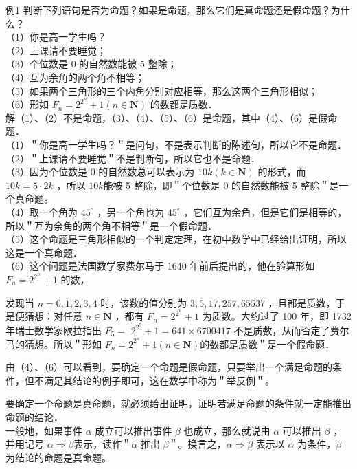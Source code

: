 \documentclass[10pt]{article}
\begin{document}
例1 判断下列语句是否为命题？如果是命题，那么它们是真命题还是假命题？为什么？\\
（1）你是高一学生吗？\\
（2）上课请不要睡觉；\\
（3）个位数是 0 的自然数能被 5 整除；\\
（4）互为余角的两个角不相等；\\
（5）如果两个三角形的三个内角分别对应相等，那么这两个三角形相似；\\
（6）形如 \(F_{n}=2^{2^{n}}+1(n \in \mathbf{N})\) 的数都是质数．\\
解（1）、（2）不是命题，（3）、（4）、（5）、（6）是命题，其中（4）、（6）是假命题．\\
（1）＂你是高一学生吗？＂是问句，不是表示判断的陈述句，所以它不是命题．\\
（2）＂上课请不要睡觉＂不是判断句，所以它也不是命题．\\
（3）因为个位数是 0 的自然数总可以表示为 \(10 k(k \in \mathbf{N})\) 的形式，而 \(10 k=5 \cdot 2 k\) ，所以 \(10 k\)能被 5 整除，即＂个位数是 0 的自然数能被 5 整除＂是一个真命题。\\
（4）取一个角为 \(45^{\circ}\) ，另一个角也为 \(45^{\circ}\) ，它们互为余角，但是它们是相等的，所以＂互为余角的两个角不相等＂是一个假命题．\\
（5）这个命题是三角形相似的一个判定定理，在初中数学中已经给出证明，所以这是一个真命题．\\
（6）这个问题是法国数学家费尔马于 1640 年前后提出的，他在验算形如 \(F_{n}=2^{2^{n}}+1\) 的数，

发现当 \(n=0,1,2,3,4\) 时，该数的值分别为 \(3,5,17,257,65537\) ，且都是质数，于是便猜想：对任意 \(n \in \mathbf{N}\) ，都有 \(F_{n}=2^{2^{n}}+1\) 为质数。大约过了 100 年，即 1732 年瑞士数学家欧拉指出 \(F_{5}=\) \(2^{2^{5}}+1=641 \times 6700417\) 不是质数，从而否定了费尔马的猜想。所以＂形如 \(F_{n}=2^{2^{n}}+1(n \in \mathbf{N})\)的数都是质数＂是一个假命题．

由（4）、（6）可以看到，要确定一个命题是假命题，只要举出一个满足命题的条件，但不满足其结论的例子即可，这在数学中称为＂举反例＂。

要确定一个命题是真命题，就必须给出证明，证明若满足命题的条件就一定能推出命题的结论．\\
一般地，如果事件 \(\alpha\) 成立可以推出事件 \(\beta\) 也成立，那么就说由 \(\alpha\) 可以推出 \(\beta\) ，并用记号 \(\alpha \Rightarrow \beta\)表示，读作＂\(\alpha\) 推出 \(\beta\)＂。换言之，\(\alpha \Rightarrow \beta\) 表示以 \(\alpha\) 为条件，\(\beta\) 为结论的命题是真命题。
\end{document}
